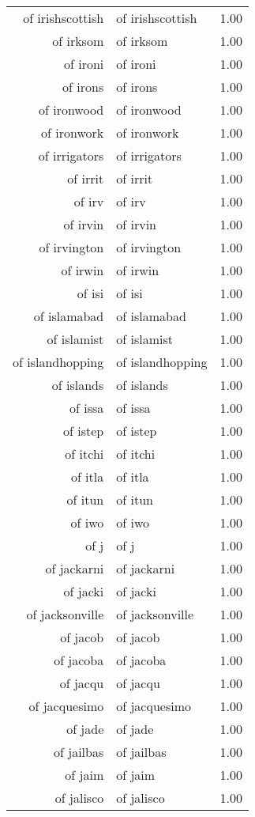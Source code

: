 \begin{table}[ht]
\begin{tabular}{rlr}
  of irishscottish & of irishscottish & 1.00 \\ 
  of irksom & of irksom & 1.00 \\ 
  of ironi & of ironi & 1.00 \\ 
  of irons & of irons & 1.00 \\ 
  of ironwood & of ironwood & 1.00 \\ 
  of ironwork & of ironwork & 1.00 \\ 
  of irrigators & of irrigators & 1.00 \\ 
  of irrit & of irrit & 1.00 \\ 
  of irv & of irv & 1.00 \\ 
  of irvin & of irvin & 1.00 \\ 
  of irvington & of irvington & 1.00 \\ 
  of irwin & of irwin & 1.00 \\ 
  of isi & of isi & 1.00 \\ 
  of islamabad & of islamabad & 1.00 \\ 
  of islamist & of islamist & 1.00 \\ 
  of islandhopping & of islandhopping & 1.00 \\ 
  of islands & of islands & 1.00 \\ 
  of issa & of issa & 1.00 \\ 
  of istep & of istep & 1.00 \\ 
  of itchi & of itchi & 1.00 \\ 
  of itla & of itla & 1.00 \\ 
  of itun & of itun & 1.00 \\ 
  of iwo & of iwo & 1.00 \\ 
  of j & of j & 1.00 \\ 
  of jackarni & of jackarni & 1.00 \\ 
  of jacki & of jacki & 1.00 \\ 
  of jacksonville & of jacksonville & 1.00 \\ 
  of jacob & of jacob & 1.00 \\ 
  of jacoba & of jacoba & 1.00 \\ 
  of jacqu & of jacqu & 1.00 \\ 
  of jacquesimo & of jacquesimo & 1.00 \\ 
  of jade & of jade & 1.00 \\ 
  of jailbas & of jailbas & 1.00 \\ 
  of jaim & of jaim & 1.00 \\ 
  of jalisco & of jalisco & 1.00 \\ 

\end{tabular}
\end{table}
